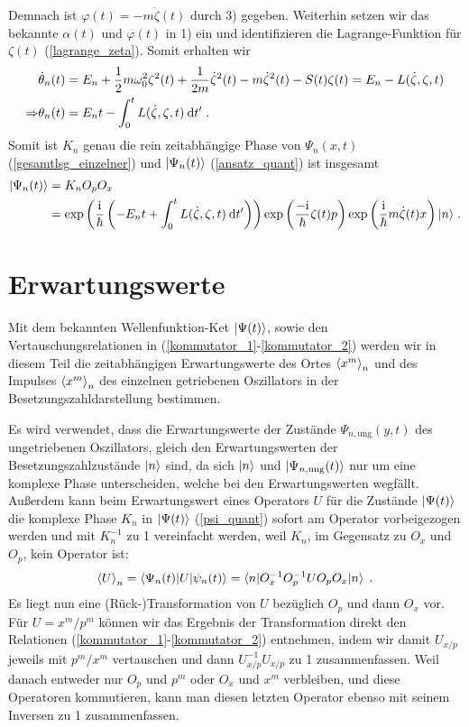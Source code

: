   Demnach ist $\varphi(t)=-m\dot\zeta(t)$ durch 3) gegeben.
  Weiterhin setzen wir das bekannte $\alpha(t)$ und $\varphi(t)$ in 1) ein und identifizieren die Lagrange-Funktion für $\zeta(t)$ (\ref{lagrange_zeta}). Somit erhalten wir
  \begin{align}
    &\dot\theta_n(t)=E_n+\frac{1}{2}m\omega_0^2\zeta^2(t)+\frac{1}{2m}\dot\zeta^2(t)-m\dot\zeta^2(t)-S(t)\zeta(t)
    =E_n-L(\dot\zeta,\zeta,t) \notag\\
    \Rightarrow &\theta_n(t)=E_nt-\int_0^tL(\dot\zeta,\zeta,t)\:\text dt' \;.
  \end{align}
  Somit ist $K_n$ genau die rein zeitabhängige Phase von $\Psi_n(x,t)$ (\ref{gesamtlsg_einzelner}) und $\lvert\Psi_n(t)\rangle$ (\ref{ansatz_quant}) ist insgesamt
  \begin{align}
    \lvert\Psi_n(t)\rangle&=K_nO_pO_x\notag\\
    &=\exp\left(\frac{\text i}{\hbar}\left(-E_nt+\int_0^tL(\dot\zeta,\zeta,t)\:\text dt'\right)\right)\exp\left(\frac{-\text i}{\hbar}\zeta(t)p\right)\exp\left(\frac{\text i}{\hbar}m\dot\zeta(t)x\right)\lvert n\rangle \; .
    \label{psi_quant}
  \end{align}



\section{Erwartungswerte}
  Mit dem bekannten Wellenfunktion-Ket $\lvert\Psi(t)\rangle$, sowie den Vertauschungsrelationen in (\ref{kommutator_1}-\ref{kommutator_2}) werden wir in diesem Teil die zeitabhängigen Erwartungswerte des Ortes $\braket{x^m}_n$ und des Impulses $\braket{x^m}_n$ des einzelnen getriebenen Oszillators in der Besetzungszahldarstellung bestimmen.

  Es wird verwendet, dass die Erwartungswerte der Zustände $\Psi_{n,\text{ung}}(y,t)$ des ungetriebenen Oszillators, gleich den Erwartungswerten der Besetzungszahlzustände $\lvert n\rangle$ sind, da sich $\lvert n\rangle$ und $\lvert\Psi_{n,\text{ung}}(t)\rangle$ nur um eine komplexe Phase unterscheiden, welche bei den Erwartungswerten wegfällt.
  Außerdem kann beim Erwartungswert eines Operators $U$ für die Zustände $\lvert\Psi(t)\rangle$ die komplexe Phase $K_n$ in $\lvert\Psi(t)\rangle$ (\ref{psi_quant}) sofort am Operator vorbeigezogen werden und mit $K_n^{-1}$ zu 1 vereinfacht werden, weil $K_n$, im Gegensatz zu $O_x$ und $O_p$, kein Operator ist:
  \begin{equation}
    \braket{U}_n=\braket{\Psi_n(t)|U|\psi_n(t)}=\braket{n|O_x^{-1}O_p^{-1}UO_pO_x|n} \;.
  \end{equation}
  Es liegt nun eine (Rück-)Transformation von $U$ bezüglich $O_p$ und dann $O_x$ vor.
  Für $U=x^m/p^m$ können wir das Ergebnis der Transformation direkt den Relationen (\ref{kommutator_1}-\ref{kommutator_2}) entnehmen, indem wir damit $U_{x/p}$ jeweils mit $p^m/x^m$ vertauschen und dann $U_{x/p}^{-1}U_{x/p}$ zu 1 zusammenfassen.
  Weil danach entweder nur $O_p$ und $p^m$ oder $O_x$ und $x^m$ verbleiben, und diese Operatoren kommutieren, kann man diesen letzten Operator ebenso mit seinem Inversen zu 1 zusammenfassen.

